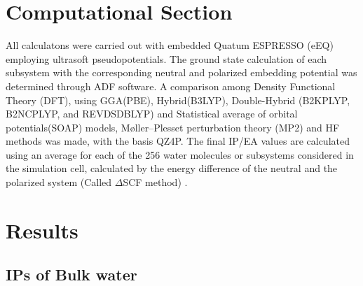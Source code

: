 \documentclass[12pt,a4paper]{article}
\begin{document}
\section{Computational Section}

All calculatons were carried out with embedded Quatum ESPRESSO (eEQ) employing ultrasoft pseudopotentials. The ground state calculation of each
subsystem with the corresponding neutral and polarized embedding potential was determined through ADF \cite{te2001chemistry} software. A comparison
among Density Functional Theory (DFT), using GGA(PBE), Hybrid(B3LYP), Double-Hybrid (B2KPLYP, B2NCPLYP, and REVDSDBLYP) and Statistical average of
orbital potentials(SOAP) models, Møller–Plesset perturbation theory (MP2) and HF methods was made, with the basis QZ4P. The final IP/EA values are
calculated using an average for each of the 256 water molecules or subsystems considered in the simulation cell, calculated by the energy difference
of the neutral and the polarized system (Called $\Delta$SCF method) \cite{bagus1965self,waskom2017mwaskom}.

\section{Results}
\subsection{IPs of Bulk water}
\end{document}
